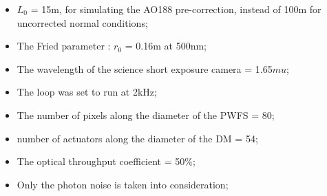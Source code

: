 \documentclass[twocolumn]{aastex62}
\begin{document}
\begin{itemize}[noitemsep,nolistsep]
    \item $L_0$ = 15m, for simulating the AO188 pre-correction, instead of 100m for uncorrected normal conditions;
    \item The Fried parameter : $r_0$ = 0.16m at 500nm;
    \item The wavelength of the science short exposure camera = 1.65$mu$;
    \item The loop was set to run at 2kHz;
    \item The number of pixels along the diameter of the PWFS = 80;
    \item number of actuators along the diameter of the DM = 54;
    \item The optical throughput coefficient = 50\%;
    \item Only the photon noise is taken into consideration;\\
\end{itemize}
\end{document}
